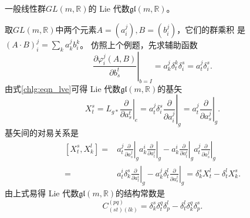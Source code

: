 \begin{example}\label{chlg:exam_GL-la}
    一般线性群$GL(m,\mathbb{R})$的 Lie 代数$\mathfrak{gl}(m,\mathbb{R})$。
\end{example}
取$GL(m,\mathbb{R})$中两个元素$A=(a^j_{i}), B=(b^j_{i})$，它们的群乘积
是$(A\cdot B)^{j}_{i} = \sum_{k} a^j_{k} b^k_{i}$。
仿照上个例题，先求辅助函数
\begin{equation}
    \left. \frac{\partial \varphi^{j}_{i} (A,B)}{\partial b_{s}^t}\right|_{b=I} =
    a^j_{k} \delta^k_{t} \delta^s_{i}=a^j_{t} \delta^s_{i}.
\end{equation}
由式\eqref{chlg:eqn_lve}可得 Lie 代数$\mathfrak{gl}(m,\mathbb{R})$的基矢
\begin{equation}
    X_{t}^s=L_{g*} \left.\frac{\partial }{\partial a_{s}^t}\right|_{e}
    =a^j_{t} \delta^s_{i} \left.\frac{\partial }{\partial a_{i}^j}\right|_{g}
    =a^j_{t} \left.\frac{\partial }{\partial a_{s}^j}\right|_{g} .
\end{equation}
基矢间的对易关系是
\begin{equation}
\begin{aligned}
    [X_{t}^s, X_{k}^l]=&a^j_{t} \left.\frac{\partial }{\partial a_{s}^j}\right|_{g}
      a^i_{k} \left.\frac{\partial }{\partial a_{l}^i}\right|_{g}
    - a^i_{k} \left.\frac{\partial }{\partial a_{l}^i}\right|_{g}
      a^j_{t} \left.\frac{\partial }{\partial a_{s}^j}\right|_{g} \\
    =&a^i_{t} \delta^s_{k} \left.\frac{\partial }{\partial a_{l}^i}\right|_{g}
    - a^j_{k} \delta^l_{t} \left.\frac{\partial }{\partial a_{s}^j}\right|_{g}
    =\delta^s_{k} X^l_{t} -\delta^l_{t} X^s_{k} .
\end{aligned}\end{equation}
由上式易得 Lie 代数$\mathfrak{gl}(m,\mathbb{R})$的结构常数是
\begin{equation}\label{chlg:eqn_gl-sc}
    C^{(pq)}_{(st)(lk)}= \delta^s_{k} \delta^q_{t} \delta^l_{p}
      -\delta^l_{t} \delta^q_{k} \delta^s_{p} .
\end{equation}

